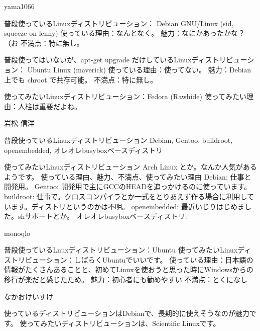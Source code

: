 \begin{prework}{ yama1066 }

普段使っているLinuxディストリビューション：
Debian GNU/Linux (sid, squeeze on lenny)
使っている理由：なんとなく。
魅力：なにかあったかな？（お
不満点：特に無し。

普段使ってはいないが、apt-get upgrade だけしているLinuxディストリビューション：
Ubuntu Linux (maverick)
使っている理由：使ってない。
魅力：Debian上でも chroot で共存可能。
不満点：特に無し。

使ってみたいLinuxディストリビューション：Fedora (Rawhide)
使ってみたい理由：人柱は重要だよね。

\end{prework}



\begin{prework}{ 岩松 信洋 }

普段使っているLinuxディストリビューション
Debian, Gentoo, buildroot, openembedded, オレオレbusyboxベースディストリ

使ってみたいLinuxディストリビューション
Arch Linux とか。なんか人気があるようです。
使っている理由、魅力、不満点、使ってみたい理由
Debian: 仕事と開発用。
Gentoo: 開発用で主にGCCのHEADを追っかけるのに使っています。
buildroot: 仕事で。クロスコンパイラとか一式をとりあえず作る場合に利用しています。ディストリというのかは不明。
openembedded: 最近いじりはじめました。shサポートとか。
オレオレbusyboxベースディストリ: 


\end{prework}



\begin{prework}{ monoqlo }

普段使っているLnuxディストリビューション：Ubuntu
使ってみたいLinuxディストリビューション：しばらくUbuntuでいいです。
使っている理由：日本語の情報がたくさんあることと、初めてLinuxを使おうと思った時にWindowsからの移行が楽だと感じたため。
魅力：初心者にも勧めやすい
不満点：とくになし

\end{prework}



\begin{prework}{ なかおけいすけ }

使っているディストリビューションはDebianで、長期的に使えそうなのが魅力です。
使ってみたいディストリビューションは、Scientific Linuxです。

\end{prework}



